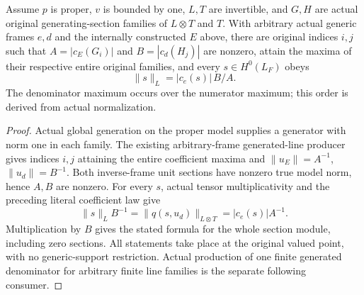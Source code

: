 \begin{theorem}
\label{thm:seven-general-generated-norm-quotient}
\leanok
Assume $p$ is proper, $v$ is bounded by one, $L,T$ are invertible, and
$G,H$ are actual original generating-section families of $L\otimes T$
and $T$. With arbitrary actual generic frames $e,d$ and the internally
constructed $E$ above, there are original indices $i,j$ such that
$A=|c_E(G_i)|$ and $B=|c_d(H_j)|$ are nonzero, attain the maxima of their
respective entire original families, and every $s\in H^0(L_F)$ obeys
\[
 \lVert s\rVert_L=|c_e(s)|\,B/A.
\]
The denominator maximum occurs over the numerator maximum; this order is
derived from actual normalization.
\end{theorem}
\begin{proof}
Actual global generation on the proper model supplies a generator with
norm one in each family. The existing arbitrary-frame generated-line
producer gives indices $i,j$ attaining the entire coefficient maxima and
$\lVert u_E\rVert=A^{-1}$, $\lVert u_d\rVert=B^{-1}$. Both inverse-frame
unit sections have nonzero true model norm, hence $A,B$ are nonzero.
For every $s$, actual tensor multiplicativity and the preceding literal
coefficient law give
\[
 \lVert s\rVert_L B^{-1}
 =\lVert q(s,u_d)\rVert_{L\otimes T}
 =|c_e(s)|A^{-1}.
\]
Multiplication by $B$ gives the stated formula for the whole section module,
including zero sections. All statements take place at the original valued
point, with no generic-support restriction. Actual production of one
finite generated denominator for arbitrary finite line families is the
separate following consumer.
\end{proof}

